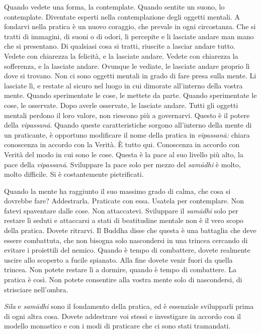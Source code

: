 Quando vedete una forma, la contemplate. Quando sentite un suono, lo
contemplate. Diventate esperti nella contemplazione degli oggetti
mentali. A fondarvi nella pratica è un nuovo coraggio, che prevale in
ogni circostanza. Che si tratti di immagini, di suoni o di odori, li
percepite e li lasciate andare man mano che si presentano. Di qualsiasi
cosa si tratti, riuscite a lasciar andare tutto. Vedete con chiarezza la
felicità, e la lasciate andare. Vedete con chiarezza la sofferenza, e la
lasciate andare. Ovunque le vediate, le lasciate andare proprio lì dove
si trovano. Non ci sono oggetti mentali in grado di fare presa sulla
mente. Li lasciate lì, e restate al sicuro nel luogo in cui dimorate
all'interno della vostra mente. Quando sperimentate le cose, le mettete
da parte. Quando sperimentate le cose, le osservate. Dopo averle
osservate, le lasciate andare. Tutti gli oggetti mentali perdono il loro
valore, non riescono più a governarvi. Questo è il potere della
\emph{vipassanā}. Quando queste caratteristiche sorgono all'interno
della mente di un praticante, è opportuno modificare il nome della
pratica in \emph{vipassanā:} chiara conoscenza in accordo con la Verità.
È tutto qui. Conoscenza in accordo con Verità del modo in cui sono le
cose. Questa è la pace al suo livello più alto, la pace della
\emph{vipassanā}. Sviluppare la pace solo per mezzo del \emph{samādhi} è
molto, molto difficile. Si è costantemente pietrificati.

Quando la mente ha raggiunto il suo massimo grado di calma, che cosa si
dovrebbe fare? Addestrarla. Praticate con essa. Usatela per contemplare.
Non fatevi spaventare dalle cose. Non attaccatevi. Sviluppare il
\emph{samādhi} solo per restare lì seduti e attaccarsi a stati di
beatitudine mentale non è il vero scopo della pratica. Dovete ritrarvi.
Il Buddha disse che questa è una battaglia che deve essere combattuta,
che non bisogna solo nascondersi in una trincea cercando di evitare i
proiettili del nemico. Quando è tempo di combattere, dovete realmente
uscire allo scoperto a fucile spianato. Alla fine dovete venir fuori da
quella trincea. Non potete restare lì a dormire, quando è tempo di
combattere. La pratica è così. Non potete consentire alla vostra mente
solo di nascondersi, di strisciare nell'ombra.

\emph{Sīla} e \emph{samādhi} sono il fondamento della pratica, ed è
essenziale svilupparli prima di ogni altra cosa. Dovete addestrare voi
stessi e investigare in accordo con il modello monastico e con i modi di
praticare che ci sono stati tramandati.

